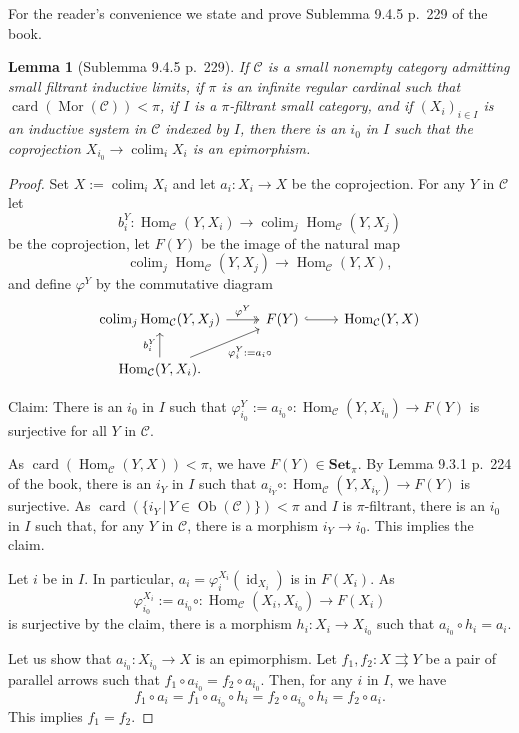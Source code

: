 \documentclass[12pt]{article}%
\newtheorem{lem}[thm]{Lemma}
\theoremstyle{remark}
\theoremstyle{definition}
\newcommand{\C}{\mathcal C}
\newcommand{\Set}{\mathbf{Set}}
\newcommand{\pp}{\varphi}
\newcommand{\parar}{\rightrightarrows}
\DeclareMathOperator*{\colim}{colim}
\DeclareMathOperator{\card}{card}%
\DeclareMathOperator{\id}{id}
\DeclareMathOperator{\Hom}{Hom}%
\DeclareMathOperator{\Mor}{Mor}
\DeclareMathOperator{\Ob}{Ob}
\begin{document}
For the reader's convenience we state and prove Sublemma 9.4.5 p.~229 of the book.

\begin{lem}[Sublemma 9.4.5 p.~229]\label{945}
If $\C$ is a small nonempty category admitting small filtrant inductive limits, if $\pi$ is an infinite regular cardinal such that $\card(\Mor(\C))<\pi$, if $I$ is a $\pi$-filtrant small category, and if $(X_i)_{i\in I}$ is an inductive system in $\C$ indexed by $I$, then there is an $i_0$ in $I$ such that the coprojection $X_{i_0}\to\colim_iX_i$ is an epimorphism. 
\end{lem}

\begin{proof}
Set $X:=\colim_iX_i$ and let $a_i:X_i\to X$ be the coprojection. For any $Y$ in $\C$ let 
$$
b^Y_i:\Hom_\C(Y,X_i)\to\colim_j\Hom_\C(Y,X_j)
$$ 
be the coprojection, let $F(Y)$ be the image of the natural map 
$$
\colim_j\Hom_\C(Y,X_j)\to\Hom_\C(Y,X),
$$ 
and define $\pp^Y$ by the commutative diagram 
$$
\begin{tikzcd}
\colim_j\Hom_\C(Y,X_j)\ar[two heads]{r}{\pp^Y}&F(Y)\ar[hook]{r}&\Hom_\C(Y,X)\\ 
\Hom_\C(Y,X_i).\ar{u}{b^Y_i}\ar{ur}[swap]{\pp^Y_i:=a_i\circ}
\end{tikzcd}
$$ 

Claim: There is an $i_0$ in $I$ such that $\pp^Y_{i_0}:=a_{i_0}\circ:\Hom_\C(Y,X_{i_0})\to F(Y)$ is surjective for all $Y$ in $\C$.

As $\card(\Hom_\C(Y,X))<\pi$, we have $F(Y)\in\Set_\pi$. By Lemma 9.3.1 p.~224 of the book, there is an $i_Y$ in $I$ such that $a_{i_Y}\circ:\Hom_\C(Y,X_{i_Y})\to F(Y)$ is surjective. As $\card(\{i_Y\,|\,Y\in\Ob(\C)\})<\pi$ and $I$ is $\pi$-filtrant, there is an $i_0$ in $I$ such that, for any $Y$ in $\C$, there is a morphism $i_Y\to i_0$. This implies the claim. 

Let $i$ be in $I$. In particular, $a_i=\pp^{X_i}_i(\id_{X_i})$ is in $F(X_i)$. As 
$$
\pp^{X_i}_{i_0}:=a_{i_0}\circ:\Hom_\C(X_i,X_{i_0})\to F(X_i)
$$ 
is surjective by the claim, there is a morphism $h_i:X_i\to X_{i_0}$ such that $a_{i_0}\circ h_i=a_i$. 

Let us show that $a_{i_0}:X_{i_0}\to X$ is an epimorphism. Let $f_1,f_2:X\parar Y$ be a pair of parallel arrows such that $f_1\circ a_{i_0}=f_2\circ a_{i_0}$. Then, for any $i$ in $I$, we have 
$$
f_1\circ a_i=f_1\circ a_{i_0}\circ h_i=f_2\circ a_{i_0}\circ h_i=f_2\circ a_i.
$$ 
This implies $f_1=f_2$.
\end{proof}
\end{document}
